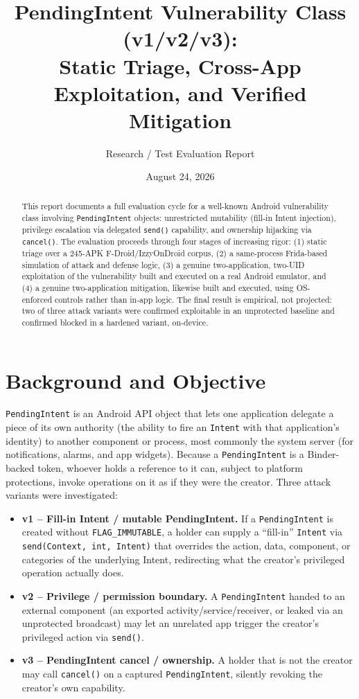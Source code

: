 \documentclass[11pt]{article}
\title{PendingIntent Vulnerability Class (v1/v2/v3):\\
Static Triage, Cross-App Exploitation, and Verified Mitigation}
\author{Research / Test Evaluation Report}
\date{August 24, 2026}
\begin{document}
\maketitle

\begin{abstract}
This report documents a full evaluation cycle for a well-known Android vulnerability
class involving \texttt{PendingIntent} objects: unrestricted mutability (fill-in Intent
injection), privilege escalation via delegated \texttt{send()} capability, and ownership
hijacking via \texttt{cancel()}. The evaluation proceeds through four stages of
increasing rigor: (1) static triage over a 245-APK F-Droid/IzzyOnDroid corpus, (2) a
same-process Frida-based simulation of attack and defense logic, (3) a genuine
two-application, two-UID exploitation of the vulnerability built and executed on a real
Android emulator, and (4) a genuine two-application mitigation, likewise built and
executed, using OS-enforced controls rather than in-app logic. The final result is
empirical, not projected: two of three attack variants were confirmed exploitable in an
unprotected baseline and confirmed blocked in a hardened variant, on-device.
\end{abstract}

\tableofcontents

\section{Background and Objective}

\texttt{PendingIntent} is an Android API object that lets one application delegate a
piece of its own authority (the ability to fire an \texttt{Intent} with that
application's identity) to another component or process, most commonly the system
server (for notifications, alarms, and app widgets). Because a \texttt{PendingIntent}
is a Binder-backed token, whoever holds a reference to it can, subject to platform
protections, invoke operations on it as if they were the creator. Three attack
variants were investigated:

\begin{itemize}[leftmargin=1.5em]
    \item \textbf{v1 -- Fill-in Intent / mutable PendingIntent.} If a
    \texttt{PendingIntent} is created without \texttt{FLAG\_IMMUTABLE}, a holder can
    supply a ``fill-in'' \texttt{Intent} via \texttt{send(Context, int, Intent)} that
    overrides the action, data, component, or categories of the underlying Intent,
    redirecting what the creator's privileged operation actually does.
    \item \textbf{v2 -- Privilege / permission boundary.} A \texttt{PendingIntent}
    handed to an external component (an exported activity/service/receiver, or leaked
    via an unprotected broadcast) may let an unrelated app trigger the creator's
    privileged action via \texttt{send()}.
    \item \textbf{v3 -- PendingIntent cancel / ownership.} A holder that is not the
    creator may call \texttt{cancel()} on a captured \texttt{PendingIntent}, silently
    revoking the creator's own capability.
    \end{itemize}
\end{document}
